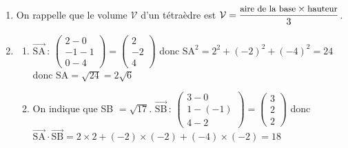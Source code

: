 \documentclass[10pt]{article}
\providecommand{\vectt}[1]{\overrightarrow{\mathrm{#1}}}
\begin{document}
\begin{enumerate}
\begin{enumerate}
Donc: $2\left (2t\right ) + \left (1+t\right ) -\left (4-t\right )-3=0$, c'est-à-dire
$4t +1+t - 4 +t-3 =0$ soit $t=1$.

Pour $t=1$, on aura $x=2\times 1 = 2$,	$y=1+1=2$ et $z=4-1=3$.

Les coordonnées du point H sont donc $(2~;~2~;~3)$.
		
	\end{enumerate}
\item  On rappelle que le volume $\mathcal V$ d'un tétraèdre est $\mathcal V = \dfrac{\small \text{aire de la base} \times \text{hauteur}}{3}$.



\item  
	\begin{enumerate}
		\item 
		
		$\vectt{SA}\,:\,
\begin{pmatrix}
2-0 \\-1-1\\0-4
\end{pmatrix}
=
\begin{pmatrix}
2 \\-2\\4
\end{pmatrix}
$
donc
$\text{SA}^2 = 2^2+(-2)^2+(-4)^2=24$ donc $\text{SA}=\sqrt{24}=2\sqrt{6}$
		
		\item On indique que SB $= \sqrt{17}$. $\vectt{SB}\,:\,
\begin{pmatrix}
3-0 \\1-(-1)\\4-2
\end{pmatrix}
=
\begin{pmatrix}
3 \\2\\2
\end{pmatrix}$
donc
$\vectt{SA}\cdot \vectt{SB} = 2\times 2 + (-2)\times (-2) + (-4)\times (-2)=18$


\end{enumerate}
\end{enumerate}
\end{document}
